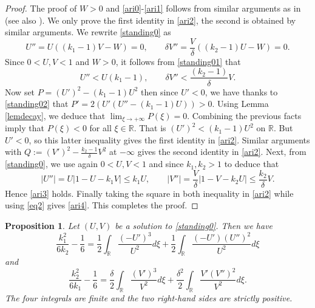 \documentclass[11pt]{article}
\numberwithin{equation}{section}
\newcommand{\1}{\mathbbm{1}}
\numberwithin{equation}{section}
\newtheorem{proposition}[theorem]{Proposition}
\theoremstyle{definition}
\def \dis {\displaystyle}
\def \R {\mathbb{R}}
\numberwithin{equation}{section}
\def \dis {\displaystyle}
\begin{document}
\begin{proof}
	The proof of $W>0$ and  \eqref{ari0}-\eqref{ari1} follows from similar arguments as in \cite[proof of Theorem 4.1 and Corollary 4.2]{kenne2026} (see also \cite{guo2013}).   We only prove the first identity in \eqref{ari2}, the second is obtained by similar arguments. 
	We rewrite \eqref{standing0} as
	\begin{equation}\label{standing01}
		U''=U((k_1-1)V-W)=0, \qquad \delta V''=\frac{V}{\delta}((k_2-1)U-W)=0.
	\end{equation}
	Since $0<U,V<1$ and $W>0$, it follows from \eqref{standing01} that 
		\begin{equation}\label{standing02}
		U''< U(k_1-1), \qquad \delta V''< \frac{(k_2-1)}{\delta}V.
	\end{equation}
	Now set $P=(U')^2-(k_1-1)U^2$ then since $U'<0$, we have thanks to \eqref{standing02}  that $P'=2(U'(U''-(k_1-1)U))>0$. Using Lemma \ref{lemdecay}, we deduce that $\dis \lim_{\xi\to +\infty}P(\xi)=0$. Combining the previous facts imply that $P(\xi)<0$ for all $\xi \in \R$. That is $(U')^2<(k_1-1)U^2$ on $\R$. But $U'<0$, so this latter inequality gives the first identity in \eqref{ari2}. Similar arguments with $Q:=(V')^2-\frac{k_2-1}{\delta} V^2$ at $-\infty$ gives the second identity in \eqref{ari2}.  
	Next, from \eqref{standing0}, we use again $0<U,V<1$ and since $k_1,k_2>1$ to deduce that
\begin{equation*}
	|U''|=U|1-U-k_1V|\leq k_1U, \qquad |V''|=\frac{V}{\delta}|1-V-k_2 U| \leq \frac{k_2}{\delta} V.
\end{equation*}
Hence \eqref{ari3} holds. Finally taking the square in  both inequality in \eqref{ari2} while using \eqref{eq2} gives  \eqref{ari4}. This completes the proof.
\end{proof}

\begin{proposition}\label{propenergyidentities} Let $(U,V)$ be a solution to \eqref{standing0}. Then we have
	\begin{equation}\label{energyimp1}
	\frac{k_1^2}{6k_2}-\frac{1}{6}=\frac{1}{2}\int_{\R}\frac{(-U')^3}{U^2}d\xi+\frac{1}{2}\int_{\R}\frac{(-U')(U'')^2}{U^2}d\xi
	\end{equation}
	and 
	\begin{equation}\label{energyimp2}
	\frac{k_2^2}{6k_1}-\frac{1}{6}=\frac{\delta}{2}\int_{\R}\frac{(V')^3}{V^2}d\xi+\frac{\delta^2}{2}\int_{\R}\frac{V'(V'')^2}{V^2}d\xi.
	\end{equation}
	The four integrals are finite and the two right-hand sides are strictly positive.
\end{proposition}
\end{document}

